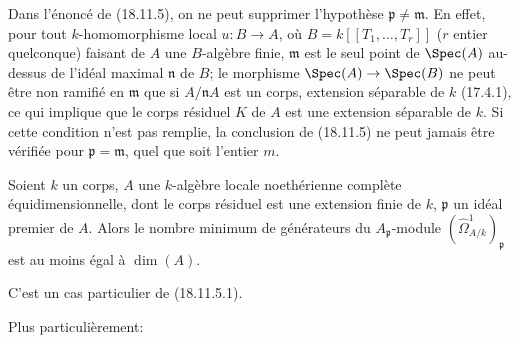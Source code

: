 \begin{remark}[18.11.6]
\label{IV.18.11.6}
Dans l'énoncé de (18.11.5), on ne peut supprimer l'hypothèse $\mathfrak p\neq\mathfrak m$. En effet, pour tout $k$-homomorphisme local $u:B\to A$, où $B=k[[T_1,\ldots,T_r]]$ ($r$ entier quelconque) faisant de $A$ une $B$-algèbre finie, $\mathfrak m$ est le seul point de $\Spec(A)$ au-dessus de l'idéal maximal $\mathfrak n$ de $B$; le morphisme $\Spec(A)\to\Spec(B)$ ne peut être non ramifié en $\mathfrak m$ que si $A/\mathfrak nA$ est un corps, extension séparable de $k$ (17.4.1), ce qui implique que le corps résiduel $K$ de $A$ est une extension séparable de $k$. Si cette condition n'est pas remplie, la conclusion de (18.11.5) ne peut jamais être vérifiée pour $\mathfrak p=\mathfrak m$, quel que soit l'entier $m$.
\end{remark}

\begin{corollary}[18.11.7]
\label{IV.18.11.7}
Soient $k$ un corps, $A$ une $k$-algèbre locale noethérienne complète équidimensionnelle, dont le corps résiduel est une extension finie de $k$, $\mathfrak p$ un idéal premier de $A$. Alors le nombre minimum de générateurs du $A_{\mathfrak p}$-module $(\hat{\Omega}^1_{A/k})_{\mathfrak p}$ est au moins égal à $\dim(A)$.
\end{corollary}

C'est un cas particulier de (18.11.5.1).

Plus particulièrement:

